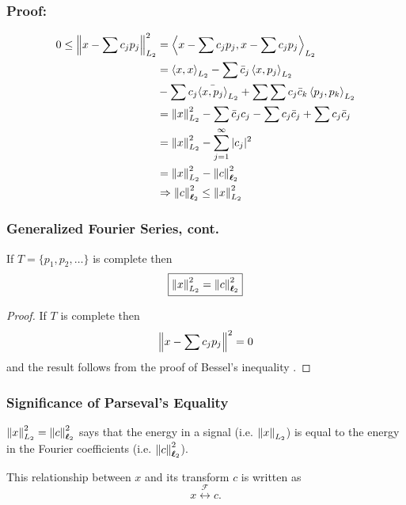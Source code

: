 \documentclass{beamer}
\begin{document}
\begin{frame}\frametitle{Proof:}

	\begin{align*}
	0 \leq \left\|x - \sum c_jp_j \right\|_{L_2}^2 &= \left<x - \sum c_jp_j, x-
		\sum c_j p_j \right>_{L_2}\\
	&= \left<x,x \right>_{L_2} 
		- \sum \bar{c}_j\left<x,p_j \right>_{L_2}
	\\ \qquad & 
		- \sum c_j\bar{\left<x,p_j \right>}_{L_2} 
		+ \sum \sum c_j \bar{c}_k \left<p_j,p_k
	\right>_{L_2}\\
	&= \left\|x \right\|_{L_2}^{2} - \sum \bar{c}_jc_j - \sum c_j\bar{c}_j + \sum
	c_j\bar{c}_j\\
	&= \left\|x \right\|_{L_2}^2 - \sum_{j=1}^{\infty} |c_j|^2\\
	&=\left\|x \right\|_{L_2}^2 - \left\|c \right\|_{\boldsymbol{\ell}_2}^2\\
	&\Rightarrow \left\|c \right\|_{\boldsymbol{\ell}_2}^2 \leq \left\|x \right\|_{L_2}^2
	\end{align*}
\end{frame}

\begin{frame}\frametitle{Generalized Fourier Series, cont.}
	\begin{theorem}
	If $T = \{p_1,p_2,\ldots \}$ is complete then
	\[ \fbox{$\left\|x \right\|_{L_2}^2 = \left\|c \right\|_{\boldsymbol{\ell}_2}^2$} \]
	\end{theorem}
	\begin{proof}
	If $T$ is complete then
	\[ \left\|x - \sum c_jp_j \right\|^2 = 0 \]
	and the result follows from the proof of Bessel's inequality	.
	\end{proof}
\end{frame}

\begin{frame}\frametitle{Significance of Parseval's Equality}
	
	$\left\|x \right\|_{L_2}^2 = \left\|c \right\|_{\boldsymbol{\ell}_2}^2$ says that the energy in a
	signal (i.e. $\left\|x \right\|_{L_2}$) is equal to the energy in the
	Fourier coefficients (i.e. $\left\|c \right\|_{\boldsymbol{\ell}_2}^2$).
	
	\vfill
	
	This relationship between $x$ and its transform $c$ is written as 
	\[
	x \overset{\mathcal{F}}{\longleftrightarrow} c.
	\]
	
\end{frame}
\end{document}
